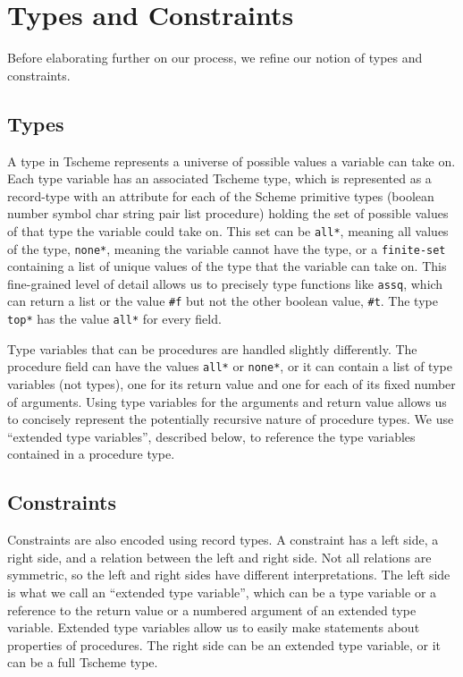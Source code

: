\documentclass[a4paper]{article}
\begin{document}
\section{Types and Constraints}
\label{sec:types-and-constraints}

Before elaborating further on our process, we refine our notion of types and 
constraints.  

\subsection{Types}

A type in Tscheme represents a universe of possible values a variable can take 
on.  Each type variable has an associated Tscheme type, which is represented 
as a record-type with an attribute for each of the Scheme primitive types 
(boolean number symbol char string pair list procedure) holding the set of 
possible values of that type the variable could take on.  This set can be
{\tt *all*}, meaning all values of the type, {\tt *none*}, meaning the 
variable cannot have the type, or a {\tt finite-set} containing a list of unique
values of the type that the variable can take on.  This fine-grained level of 
detail allows us to precisely type functions like {\tt assq}, which can return 
a list or the value {\tt \#f} but not the other boolean value, {\tt \#t}.
The type {\tt *top*} has the value {\tt *all*} for every field.  

Type variables that can be procedures are handled slightly differently.  The 
procedure field can have the values {\tt *all*} or {\tt *none*}, or it can 
contain a list of type variables (not types), one for its return value and one 
for each of its fixed number of arguments.  Using type variables for the 
arguments and return value allows us to concisely represent the potentially 
recursive nature of procedure types. We use ``extended type variables'', 
described below, to reference the type variables contained in a procedure type.  

\subsection{Constraints}

Constraints are also encoded using record types.  A constraint has a left 
side, a right side, and a relation between the left and right side.  Not all 
relations are symmetric, so the left and right sides have different 
interpretations.  The left side is what we call an ``extended type variable'', 
which can be a type variable or a reference to the return value or a numbered 
argument of an extended type variable.  Extended type variables allow us to 
easily make statements about properties of procedures.  The right side can be 
an extended type variable, or it can be a full Tscheme type.
\end{document}
